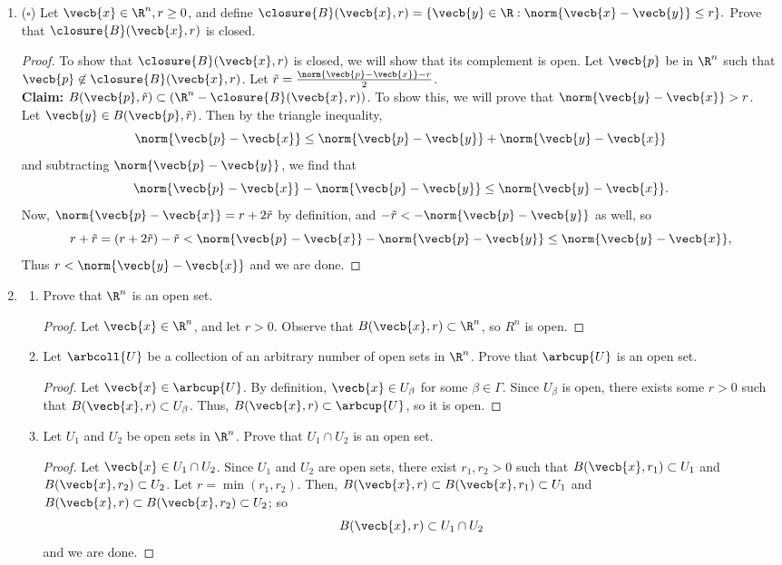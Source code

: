 \documentclass[letterpaper]{article}
\begin{document}
\begin{enumerate}
\item ($\square$) Let $\vecb{x}\in\R^n, r\geq0$, and define $\closure{B}(\vecb{x},r)=\{\vecb{y}\in\R:\norm{\vecb{x}-\vecb{y}}\leq r\}.$ Prove that $\closure{B}(\vecb{x},r)$ is closed. 
\begin{proof}
To show that $\closure{B}(\vecb{x},r)$ is closed, we will show that its complement is open. Let $\vecb{p}$ be in $\R^n$ such that $\vecb{p}\not\in\closure{B}(\vecb{x},r)$. Let $\tilde{r}=\frac{\norm{\vecb{p}-\vecb{x}}-r}{2}$. \\
\textbf{Claim:} $B(\vecb{p},\tilde{r}) \subset (\R^n-\closure{B}(\vecb{x},r))$.
To show this, we will prove that $\norm{\vecb{y}-\vecb{x}}>r$.\\
Let $\vecb{y}\in B(\vecb{p},\tilde{r})$. Then by the triangle inequality, 
$$\norm{\vecb{p}-\vecb{x}}\leq\norm{\vecb{p}-\vecb{y}}+\norm{\vecb{y}-\vecb{x}}$$
and subtracting $\norm{\vecb{p}-\vecb{y}}$, we find that 
$$\norm{\vecb{p}-\vecb{x}}-\norm{\vecb{p}-\vecb{y}}\leq\norm{\vecb{y}-\vecb{x}}.$$
Now, $\norm{\vecb{p}-\vecb{x}}=r+2\tilde{r}$ by definition, and $-\tilde{r}<-\norm{\vecb{p}-\vecb{y}}$ as well, so 
$$r+\tilde{r}=(r+2\tilde{r})-\tilde{r}<\norm{\vecb{p}-\vecb{x}}-\norm{\vecb{p}-\vecb{y}}\leq\norm{\vecb{y}-\vecb{x}},$$
Thus $r<\norm{\vecb{y}-\vecb{x}}$ and we are done. 
\end{proof}

\item \mbox{}
	\begin{enumerate}[label=(\alph*)]
	\item Prove that $\R^n$ is an open set. 
	\begin{proof}
	Let $\vecb{x}\in\R^n$, and let $r>0$. Observe that $B(\vecb{x},r)\subset\R^n$, so $R^n$ is open. 
	\end{proof}
	
	\item Let $\arbcoll{U}$ be a collection of an arbitrary number of open sets in $\R^n$. Prove that $\arbcup{U}$ is an open set. 
	\begin{proof}
	Let $\vecb{x}\in\arbcup{U}$. By definition, $\vecb{x}\in U_\beta$ for some $\beta\in\Gamma$. Since $U_\beta$ is open, there exists some $r>0$ such that $B(\vecb{x},r)\subset U_\beta$. Thus, $B(\vecb{x},r)\subset \arbcup{U}$, so it is open.
	\end{proof}
	
	\item Let $U_1$ and $U_2$ be open sets in $\R^n$. Prove that $U_1\cap U_2$ is an open set. 
	\begin{proof}
	Let $\vecb{x}\in U_1\cap U_2$. Since $U_1$ and $U_2$ are open sets, there exist $r_1, r_2 >0$ such that $B(\vecb{x},r_1)\subset U_1$ and $B(\vecb{x},r_2)\subset U_2$. Let $r=\min(r_1, r_2)$. Then, $B(\vecb{x},r)\subset B(\vecb{x},r_1)\subset U_1$ and $B(\vecb{x},r)\subset B(\vecb{x},r_2)\subset U_2$; so 
	$$B(\vecb{x},r)\subset U_1\cap U_2$$
	and we are done. 
	\end{proof}
	\end{enumerate}


\end{enumerate}
\end{document}
